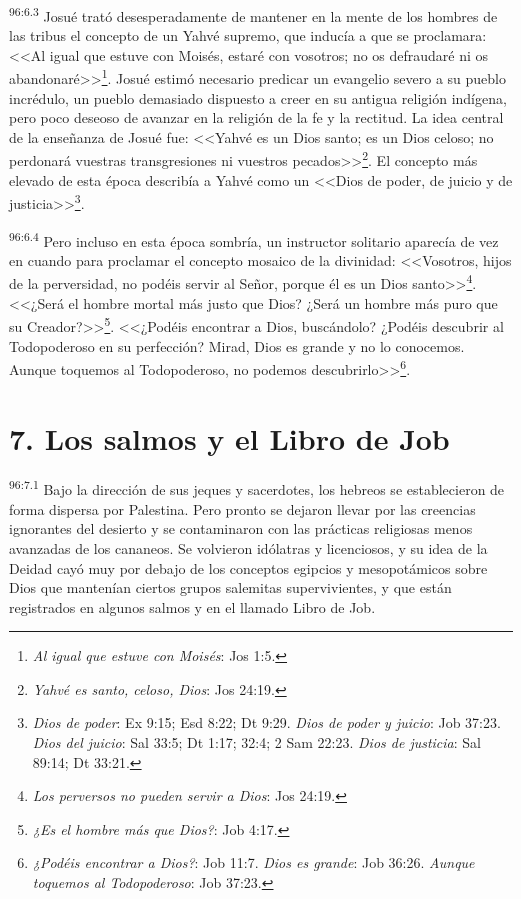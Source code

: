 \par
\textsuperscript{96:6.3} Josué trató desesperadamente de mantener en la mente de los hombres de las tribus el concepto de un Yahvé supremo, que inducía a que se proclamara: <<Al igual que estuve con Moisés, estaré con vosotros; no os defraudaré ni os abandonaré>>\footnote{\textit{Al igual que estuve con Moisés}: Jos 1:5.}. Josué estimó necesario predicar un evangelio severo a su pueblo incrédulo, un pueblo demasiado dispuesto a creer en su antigua religión indígena, pero poco deseoso de avanzar en la religión de la fe y la rectitud. La idea central de la enseñanza de Josué fue: <<Yahvé es un Dios santo; es un Dios celoso; no perdonará vuestras transgresiones ni vuestros pecados>>\footnote{\textit{Yahvé es santo, celoso, Dios}: Jos 24:19.}. El concepto más elevado de esta época describía a Yahvé como un <<Dios de poder, de juicio y de justicia>>\footnote{\textit{Dios de poder}: Ex 9:15; Esd 8:22; Dt 9:29. \textit{Dios de poder y juicio}: Job 37:23. \textit{Dios del juicio}: Sal 33:5; Dt 1:17; 32:4; 2 Sam 22:23. \textit{Dios de justicia}: Sal 89:14; Dt 33:21.}.

\par
\textsuperscript{96:6.4} Pero incluso en esta época sombría, un instructor solitario aparecía de vez en cuando para proclamar el concepto mosaico de la divinidad: <<Vosotros, hijos de la perversidad, no podéis servir al Señor, porque él es un Dios santo>>\footnote{\textit{Los perversos no pueden servir a Dios}: Jos 24:19.}. <<¿Será el hombre mortal más justo que Dios? ¿Será un hombre más puro que su Creador?>>\footnote{\textit{¿Es el hombre más que Dios?}: Job 4:17.}. <<¿Podéis encontrar a Dios, buscándolo? ¿Podéis descubrir al Todopoderoso en su perfección? Mirad, Dios es grande y no lo conocemos. Aunque toquemos al Todopoderoso, no podemos descubrirlo>>\footnote{\textit{¿Podéis encontrar a Dios?}: Job 11:7. \textit{Dios es grande}: Job 36:26. \textit{Aunque toquemos al Todopoderoso}: Job 37:23.}.

\section*{7. Los salmos y el Libro de Job}
\par
\textsuperscript{96:7.1} Bajo la dirección de sus jeques y sacerdotes, los hebreos se establecieron de forma dispersa por Palestina. Pero pronto se dejaron llevar por las creencias ignorantes del desierto y se contaminaron con las prácticas religiosas menos avanzadas de los cananeos. Se volvieron idólatras y licenciosos, y su idea de la Deidad cayó muy por debajo de los conceptos egipcios y mesopotámicos sobre Dios que mantenían ciertos grupos salemitas supervivientes, y que están registrados en algunos salmos y en el llamado Libro de Job.

